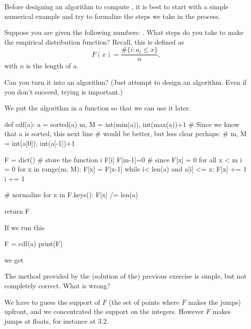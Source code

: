 \documentclass{scrartcl}
\begin{document}
Before designing an algorithm to compute , it is best to start with a simple numerical example and try to formalize the steps we take in the process.

\begin{exercise}
  Suppose you are given the following numbers: . What steps do you take to make the empirical distribution function? Recall, this is defined as
  \begin{equation}
    \label{eq:1}
    F(x) = \frac{\# \{i : a_i \leq x\}}{n}, 
  \end{equation}
  with $n$ is the length of $a$.

Can you turn it into an algorithm? (Just attempt to design an algorithm. Even if you don't succeed, trying is important.)

  \begin{solution}
We put the algorithm in a function so that we can use it later.
    \begin{pyblock}
def cdf(a):
    a = sorted(a)
    m, M = int(min(a)), int(max(a))+1
    # Since we know that a is sorted, this next line 
    # would be better, but less clear perhaps: 
    # m, M = int(a[0]), int(a[-1])+1 

    F = dict() # store the function i \to F[i]
    F[m-1]=0  # since F[x] = 0 for all x < m
    i = 0
    for x in range(m, M):
        F[x] = F[x-1]
        while i< len(a) and a[i] <= x:
            F[x] += 1
            i += 1

    # normalize
    for x in F.keys(): 
        F[x] /= len(a)

    return F
    \end{pyblock}

If we run this
\begin{pyblock}
F = cdf(a)
print(F)
\end{pyblock}
we get

\printpythontex

  \end{solution}
\end{exercise}

\begin{exercise}
  The method provided by the (solution of the) previous exercise is simple, but not completely correct. What is wrong?
  \begin{solution}
    We have to guess the support of $F$ (the set of points where $F$ makes the jumps) upfront, and we concentrated the support on the integers. However $F$ makes jumps at floats, for instance  at $3.2$. 
  \end{solution}
\end{exercise}
\end{document}
